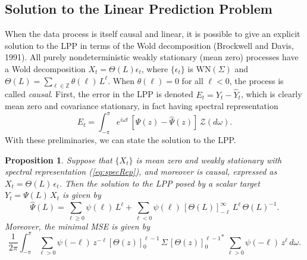 \documentclass[a4paper]{book}
\def\ZZ{\mathbb Z}
\newtheorem{Proposition}{Proposition}
\begin{document}
\subsection{Solution to the Linear Prediction Problem}

 When the data process is itself causal and linear, it is possible
 to give an explicit solution to the LPP in terms of the Wold
 decomposition (Brockwell and Davis, 1991).
  All purely nondeterministic weakly stationary (mean zero) processes
 have a Wold decomposition $X_t = \Theta (L) \epsilon_t$, where $\{
 \epsilon_t \}$ is $\mbox{WN} (\Sigma)$ and $\Theta (L) =
 \sum_{\ell \in \ZZ} \theta (\ell) \, L^{\ell}$.
 When $\theta (\ell) = 0 $ for all $\ell < 0 $, the process is called {\em causal}.
 First, the error in the LPP is denoted $E_t = Y_t - \widehat{Y}_t$, which is
 clearly mean zero  and covariance  stationary, in fact having spectral representation
\begin{equation}
\label{eq:dfa-error}
  E_t = \int_{-\pi}^{\pi} e^{i \omega t } \, 
   \left[ \Psi (z) - \widehat{\Psi} (z) \right] \, \mathcal{Z} (d\omega).
\end{equation}
  With these preliminaries, we can state the solution to the LPP.

\begin{Proposition}
 \label{prop:GPP}
 Suppose that $\{ X_t \}$ is mean zero and weakly stationary 
 with spectral representation (\ref{eq:specRep}), and moreover is
 causal, expressed as $X_t = \Theta (L) \, \epsilon_t$.    Then the solution
 to the LPP posed by a scalar target $Y_t = \Psi (L) \, X_t$ is given by
\begin{equation}
 \label{eq:GPPsoln}
 \widehat{\Psi} (L) = \sum_{\ell \geq 0 } \psi (\ell) \, L^{\ell} + \sum_{\ell < 0 } \psi (\ell)
 \,  { [ \Theta (L) ]}_{-\ell}^{ \infty  } \, L^{\ell} \, {\Theta (L) }^{-1}.
\end{equation}
 Moreover, the minimal MSE is given by
\begin{equation} 
\label{eq:minimalMSE}
 \frac{1}{ 2 \pi} \int_{-\pi}^{\pi}   \sum_{\ell > 0 } \psi (-\ell) \,
 z^{-\ell} {[ \Theta  (z) ]}_0^{\ell-1}   \,  \Sigma \,
  { {[ \Theta  (z) ]}_0^{ \ell-1} }^*  \,
   \sum_{\ell > 0 } \psi (-\ell) \,  z^{\ell}  \, d\omega.
\end{equation}
 \end{Proposition}
\end{document}
